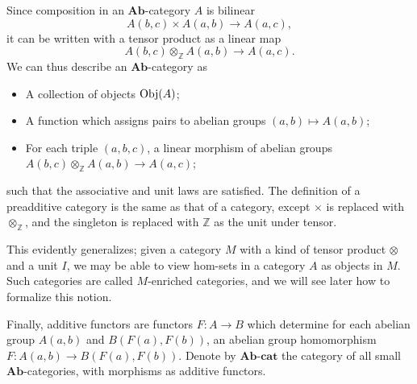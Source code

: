 Since composition in an $\mathbf{Ab} $-category $A$ is bilinear
\[
	A(b,c)\times A(a,b)\to A(a,c),
\]
it can be written with a tensor product as a linear map
\[
	A(b,c)\otimes _\mathbb{Z} A(a,b)\to A(a,c)
.\]
We can thus describe an $\mathbf{Ab} $-category as
\begin{itemize}
	\item A collection of objects $\operatorname{Obj}(A) $;
	\item A function which assigns pairs to abelian groups $(a,b)\mapsto A(a,b)$;
	\item For each triple $(a,b,c)$, a linear morphism of abelian groups $A(b,c)\otimes _\mathbb{Z} A(a,b)\to A(a,c)$;
\end{itemize}
such that the associative and unit laws are satisfied. The definition of a preadditive category is the same as that of a category, except $\times $ is replaced with $\otimes _\mathbb{Z} $, and the singleton is replaced with $\mathbb{Z} $ as the unit under tensor.

This evidently generalizes; given a category $M$ with a kind of tensor product $\otimes $ and a unit $I$, we may be able to view hom-sets in a category $A$ as objects in $M$. Such categories are called $M$-enriched categories, and we will see later how to formalize this notion.

Finally, additive functors are functors $F : A \to B$ which determine for each abelian group $A(a,b)$ and $B(F(a),F(b))$, an abelian group homomorphism $F : A(a,b) \to B(F(a),F(b))$. Denote by $\mathbf{Ab} $-$\mathbf{cat} $ the category of all small $\mathbf{Ab} $-categories, with morphisms as additive functors.
